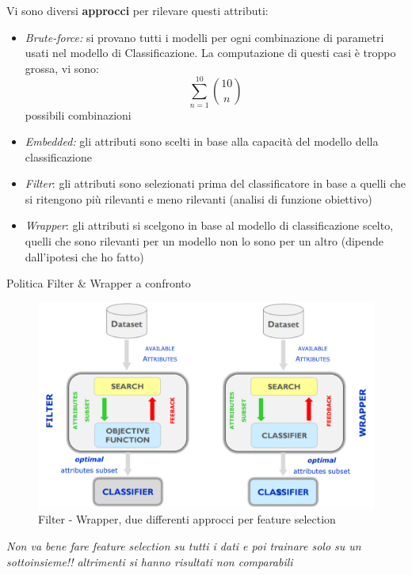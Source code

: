 Vi sono diversi \textbf{approcci} per rilevare questi attributi:
\begin{itemize}
	\item \textit{Brute-force:} si provano tutti i modelli per ogni combinazione di parametri usati nel modello di Classificazione. La computazione di questi casi è troppo grossa, vi sono: \[\sum_{n=1}^{10}\binom{10}{n}\] possibili combinazioni
	\item \textit{Embedded:} gli attributi sono scelti in base alla capacità del modello della classificazione
	\item \textit{Filter}: gli attributi sono selezionati prima del classificatore in base a quelli che si ritengono più rilevanti e meno rilevanti (analisi di funzione obiettivo)
	\item \textit{Wrapper}: gli attributi si scelgono in base al modello di classificazione scelto, quelli che sono rilevanti per un modello non lo sono per un altro (dipende dall'ipotesi che ho fatto)
\end{itemize}
Politica Filter \& Wrapper a confronto
\begin{figure}[H]
	\centering
	\includegraphics[height=0.5 \linewidth]{classification/pict/filter_wrapper.png}
	\caption{Filter - Wrapper, due differenti approcci per feature selection}
\end{figure}
\textit{Non va bene fare feature selection su tutti i dati e poi trainare solo su un sottoinsieme!! altrimenti si hanno risultati non comparabili}

